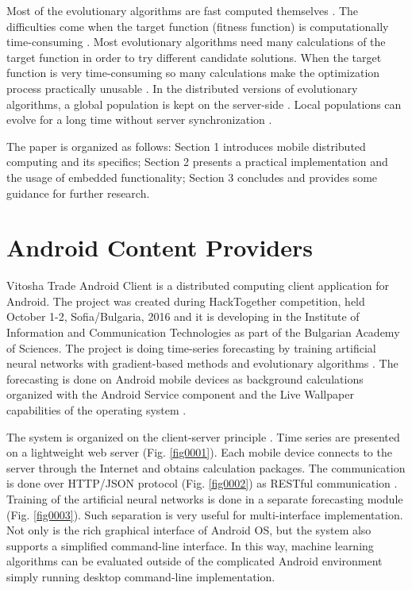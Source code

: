 \documentclass{ifacconf}
\begin{document}
Most of the evolutionary algorithms are fast computed themselves \cite{Vural-2012-a}. The difficulties come when the target function (fitness function) is computationally time-consuming \cite{Di-Pietro-2004-a}. Most evolutionary algorithms need many calculations of the target function \cite{Shi-2010-a} in order to try different candidate solutions. When the target function is very time-consuming so many calculations make the optimization process practically unusable \cite{Lee-2015-a}. In the distributed versions of evolutionary algorithms, a global population is kept on the server-side \cite{Gong-2015-a}. Local populations can evolve for a long time without server synchronization \cite{Balabanov-2016-a}. 

The paper is organized as follows: Section 1 introduces mobile distributed computing and its specifics; Section 2 presents a practical implementation and the usage of embedded functionality; Section 3 concludes and provides some guidance for further research. 

\section{Android Content Providers}

Vitosha Trade Android Client \cite{Balabanov-2022-a} is a distributed computing client application for Android. The project was created during HackTogether competition, held October 1-2, Sofia/Bulgaria, 2016 and it is developing in the Institute of Information and Communication Technologies as part of the Bulgarian Academy of Sciences. The project is doing time-series forecasting \cite{Kolarik-1994-a} by training artificial neural networks with gradient-based methods \cite{Tomov-2021-a} and evolutionary algorithms \cite{Tomov-2021-b}. The forecasting is done on Android mobile devices as background calculations organized with the Android Service component and the Live Wallpaper capabilities of the operating system \cite{Mateeva-2021-a}. 

The system is organized on the client-server principle \cite{Sinha-1992-a}. Time series are presented on a lightweight web server (Fig. \ref{fig0001}). Each mobile device connects to the server through the Internet and obtains calculation packages. The communication is done over HTTP/JSON protocol (Fig. \ref{fig0002}) as RESTful communication \cite{Orellana-2012-a}. Training of the artificial neural networks is done in a separate forecasting module (Fig. \ref{fig0003}). Such separation is very useful for multi-interface implementation. Not only is the rich graphical interface of Android OS, but the system also supports a simplified command-line interface. In this way, machine learning algorithms can be evaluated outside of the complicated Android environment simply running desktop command-line implementation. 
\end{document}
